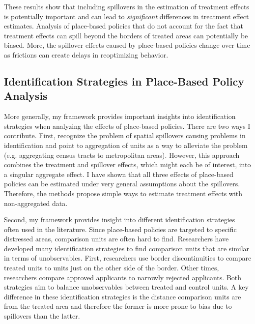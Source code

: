\documentclass[11pt]{article}
\begin{document}
These results show that including spillovers in the estimation of treatment effects is potentially important and can lead to \emph{significant} differences in treatment effect estimates. Analysis of place-based policies that do not account for the fact that treatment effects can spill beyond the borders of treated areas can potentially be biased. More, the spillover effects caused by place-based policies change over time as frictions can create delays in reoptimizing behavior. 

\subsection{Identification Strategies in Place-Based Policy Analysis}\label{sec:pbp}

More generally, my framework provides important insights into identification strategies when analyzing the effects of place-based policies. There are two ways I contribute. First, \citet{Baum-Snow_Ferreira_2015} recognize the problem of spatial spillovers causing problems in identification and point to aggregation of units as a way to alleviate the problem (e.g. aggregating census tracts to metropolitan areas). However, this approach combines the treatment and spillover effects, which might each be of interest, into a singular aggregate effect. I have shown that all three effects of place-based policies can be estimated under very general assumptions about the spillovers. Therefore, the methods propose simple ways to estimate treatment effects with non-aggregated data.

Second, my framework provides insight into different identification strategies often used in the literature. Since place-based policies are targeted to specific distressed areas, comparison units are often hard to find. Researchers have developed many identification strategies to find comparison units that are similar in terms of unobservables. First, researchers use border discontinuities to compare treated units to units just on the other side of the border. Other times, researchers compare approved applicants to narrowly rejected applicants. Both strategies aim to balance unobservables between treated and control units. A key difference in these identification strategies is the distance comparison units are from the treated area and therefore the former is more prone to bias due to spillovers than the latter.
\end{document}
